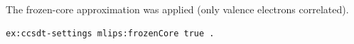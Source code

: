 The frozen-core approximation was applied (only valence electrons correlated).
\begin{lstlisting}[language=turtle]
ex:ccsdt-settings mlips:frozenCore true .
\end{lstlisting}
